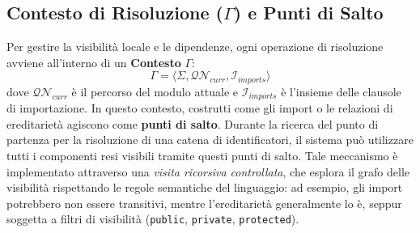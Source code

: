 
\subsection{Contesto di Risoluzione ($\Gamma$) e Punti di Salto}
Per gestire la visibilità locale e le dipendenze, ogni operazione di
risoluzione avviene all'interno di un \textbf{Contesto} $\Gamma$:
$$\Gamma = \langle \Sigma, \mathcal{QN}_{curr}, \mathcal{I}_{imports} \rangle$$
dove $\mathcal{QN}_{curr}$ è il percorso del modulo attuale e
$\mathcal{I}_{imports}$ è l'insieme delle clausole di importazione.
In questo contesto, costrutti come gli import o le relazioni di
ereditarietà agiscono come \textbf{punti di salto}. Durante la
ricerca del punto di partenza per la risoluzione di una catena di
identificatori, il sistema può utilizzare tutti i componenti resi
visibili tramite questi punti di salto. Tale meccanismo è
implementato attraverso una \textit{visita ricorsiva controllata},
che esplora il grafo delle visibilità rispettando le regole
semantiche del linguaggio: ad esempio, gli import potrebbero non
essere transitivi, mentre l'ereditarietà generalmente lo è, seppur
soggetta a filtri di visibilità (\texttt{public}, \texttt{private},
\texttt{protected}).

